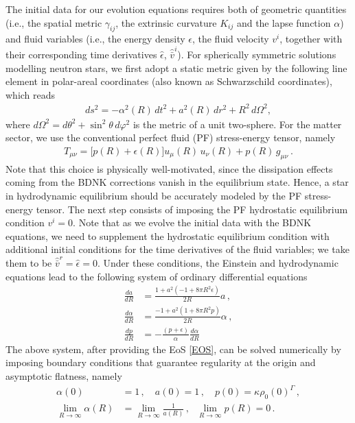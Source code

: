 \documentclass[prd,aps,twocolumn,floats,floatfix,nofootinbib,superscriptaddress] {revtex4-1}
\begin{document}
The initial data for our evolution equations requires both of geometric quantities (i.e., the spatial metric $\gamma_{ij}$, the extrinsic curvature $K_{ij}$ and the lapse function $\alpha$) and fluid variables (i.e., the energy density $\epsilon$, the fluid velocity $v^i$, together with their corresponding time derivatives $\hat{\epsilon}$, $\hat{\bar v}^i$). 
For spherically symmetric solutions modelling neutron stars, we first adopt a static metric given by the following line element in polar-areal coordinates (also known as Schwarzschild coordinates), which reads 
\begin{align}
    ds^2=-\alpha^2(R)\,dt^2+a^2(R)\,dr^2+R^2\,d \Omega^2,
    \label{schwarzschild_metric}
\end{align}
where $d\Omega^{2}=d\theta^{2}+\sin^{2}\theta\, d\varphi^{2}$ is the metric of a unit two-sphere. For the matter sector, we use the conventional perfect fluid (PF) stress-energy tensor, namely
\begin{align}
    T_{\mu\nu}=\big[p(R)+\epsilon (R)\big]u_\mu(R) \,u_\nu(R) +p(R)\,g_{\mu\nu}~.
\end{align}
Note that this choice is physically well-motivated, 
since the dissipation effects coming from the BDNK corrections vanish in the equilibrium state.
Hence, a star in hydrodynamic equilibrium should be accurately modeled by the PF stress-energy tensor. 
The next step consists of imposing the PF hydrostatic equilibrium condition $v^i=0.$  Note that as we evolve the initial data with the BDNK equations, we need to supplement the hydrostatic equilibrium condition with additional initial conditions for the time derivatives of the fluid variables;  we take them to be  $\hat{\bar v}^r=\hat{\epsilon}=0.$ Under these conditions, the Einstein and hydrodynamic equations lead to the following system of ordinary differential equations~\cite{CCC}
\begin{align}
    \frac{da}{dR} &= \frac{1+a^2(-1+8\pi  R^2 \epsilon)}{2R} a\,,\\
    \frac{d \alpha}{dR} &= \frac{-1+a^2(1+8\pi  R^2 p)}{2R} \alpha\,,\\
    \frac{d p}{dR} &= -\frac{(p+\epsilon)}{\alpha}\frac{d \alpha}{dR}
\end{align}
The above system, after providing the EoS \eqref{EOS}, can be solved numerically by imposing boundary conditions that guarantee regularity at the origin and asymptotic flatness, namely
\begin{align}
    \alpha(0) &= 1\,, \quad a(0) = 1\,,\quad p(0) = \kappa \rho_0 (0)^\Gamma\,,\\
    \lim_{R \rightarrow \infty} \alpha(R) &= \lim_{R \rightarrow \infty} \frac{1}{a(R)}\,, \ \ \ \lim_{R \rightarrow \infty} p(R) = 0\,.
    \label{boundary_conditions2}
\end{align}
\end{document}
